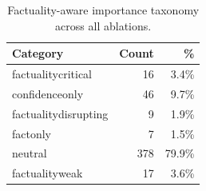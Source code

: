 \begin{table}[h]
\centering\small
\begin{tabular}{lrr}
\toprule
Category & Count & \% \\
\midrule
  factuality\-critical & 16 & 3.4\% \\
  confidence\-only & 46 & 9.7\% \\
  factuality\-disrupting & 9 & 1.9\% \\
  fact\-only & 7 & 1.5\% \\
  neutral & 378 & 79.9\% \\
  factuality\-weak & 17 & 3.6\% \\
\bottomrule
\end{tabular}
\caption{Factuality-aware importance taxonomy across all ablations.}
\label{tab:e2_taxonomy_overall}
\end{table}
